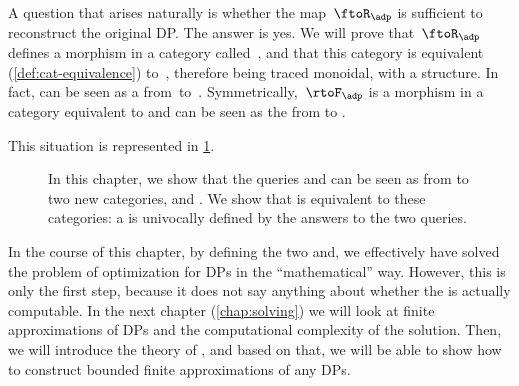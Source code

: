 A question that arises naturally is whether the map~$\ftoR_\adp$ is sufficient to reconstruct the original DP.
The answer is yes.
We will prove that~$\ftoR_\adp$ defines a morphism in a category called~\UPos, and that this category is equivalent (\cref{def:cat-equivalence}) to~\DP, therefore being traced monoidal, with a  structure.
In fact, \FixFunMinRes can be seen as a  from~\DP to~\UPos.
Symmetrically,~$\rtoF_\adp$ is a morphism in a category \LPos equivalent to \DP and \FixResMaxFun can be seen as the  from \DP to \LPos.

This situation is represented in \cref{fig:upos_lpos_dp}.

\begin{figure}[tbh]
    \centering
    \caption{In this chapter, we show that the queries \FixResMaxFun and \FixFunMinRes
        can be seen as  from \DP to two new categories, \UPos and \LPos.
        We show that \DP is equivalent to these categories: a \DP is univocally
        defined by the answers to the two queries.
    }
    \label{fig:upos_lpos_dp}
\end{figure}

In the course of this chapter, by defining the two \FixFunMinRes and\linebreak[0] \FixResMaxFun, we effectively have solved the problem of optimization for DPs in the ``mathematical'' way.
However, this is only the first step, because it does not say anything about whether the  is actually computable.
In the next chapter (\cref{chap:solving}) we will look at finite approximations of DPs and the computational complexity of the solution.
Then, we will introduce the theory of , and based on that, we will be able to show how to construct bounded finite approximations of any DPs.
